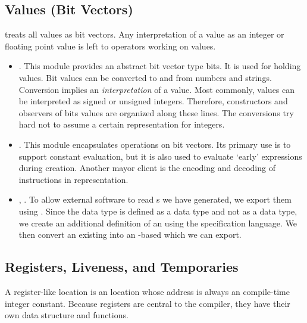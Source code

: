 \documentclass{article}%
\begin{document}
\subsection{Values (Bit Vectors)}

{\PAL} treats all values as bit vectors. Any interpretation of a value
as an integer or floating point value is left to operators working on
values.

\begin{itemize}

\item {}.  This module provides an abstract bit vector
type {\Tt{}bits\nwendquote}. It is used for holding {\PAL} values.  Bit values can be
converted to and from numbers and strings. Conversion implies an
\emph{interpretation} of a value. Most commonly, values can be
interpreted as signed or unsigned integers.  Therefore, constructors and
observers of {\Tt{}bits\nwendquote} values are organized along these lines. The
conversions try hard not to assume a certain representation for {\ocaml}
integers.

\item {}. This module encapsulates operations on bit
vectors.  Its primary use is to support constant evaluation, but it
is also used to evaluate `early' expressions during {\rtl} creation.
Another mayor client is the encoding and decoding of instructions in
{\rtl} representation.

\item {}, . To allow external
software to read {\rtl}s we have generated, we export them using
{\asdl}.  Since the {\rtl} data type is defined as a {\ocaml} data type
and not as a {\asdl} data type, we create an additional definition of an
{\rtl} using the {\asdl} specification language. We then convert an
existing {\rtl} into an \asdl-based {\rtl} which we can export.
 
\end{itemize}

\subsection{Registers, Liveness, and Temporaries}

A register-like location is an {\rtl} location whose address is always
an compile-time integer constant. Because registers are central to the
compiler, they have their own data structure and functions.
\end{document}

